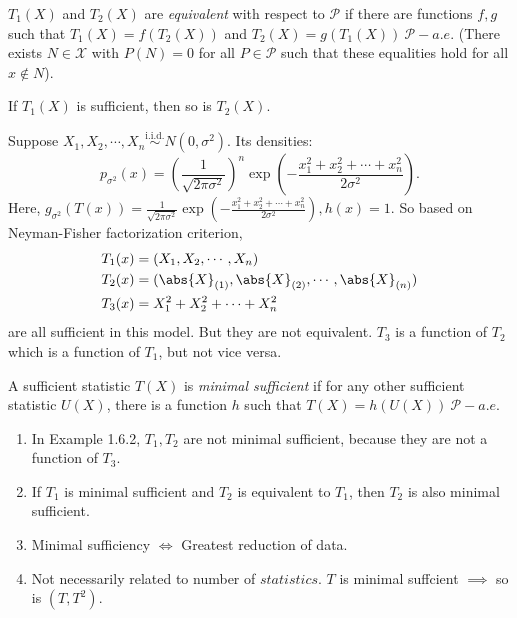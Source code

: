 \documentclass[a4paper]{article}
\begin{document}
\begin{defi}[Equivalent]
	$T_1(X)$ and $T_2(X)$ are \emph{equivalent} with respect to $\mathcal{P}$ if there are functions $f,g$ such that $T_1(X)=f(T_2(X))$ and $T_2(X)=g(T_1(X)) \ \mathcal{P}-a.e.$ (There exists $N \in \mathcal{X}$ with $P(N)=0 $ for all $P \in \mathcal{P}$ such that these equalities hold for all $x \notin N$).
\end{defi}

\begin{note}
	If $T_1(X)$ is sufficient, then so is $T_2(X)$.	
\end{note}

\begin{eg}
	Suppose $X_1, X_2, \cdots, X_n \stackrel{\text{i.i.d.}}{\sim} N(0,\sigma ^2)$. Its densities:
	\begin{equation*}
		p_{\sigma^2}(x)=\left(\frac{1}{\sqrt{2 \pi \sigma^2}}\right)^n\exp\left(-\frac{x_1^2+x_2^2+\cdots+x_n^2}{2\sigma^2}\right).
	\end{equation*}
	Here, $g_{\sigma^2}(T(x))=\frac{1}{\sqrt{2 \pi \sigma^2}}\exp\left(-\frac{x_1^2+x_2^2+\cdots+x_n^2}{2\sigma^2}\right), h(x)=1$. So based on Neyman-Fisher factorization criterion, 
	\begin{equation}
		\begin{aligned}
			T_1(x) &= (X_1,X_2,\cdots,X_n) \\
			T_2(x) &= (\abs{X}_{(1)},\abs{X}_{(2)},\cdots,\abs{X}_{(n)}) \\
			T_3(x) &= X_1^2+X_2^2+\cdots+X_n^2
		\end{aligned}
	\end{equation}
	are all sufficient in this model. But they are not equivalent. $T_3$ is a function of $T_2$ which is a function of $T_1$, but not vice versa.
\end{eg}

\begin{defi}
	A sufficient statistic $T(X)$ is \emph{minimal sufficient} if for any other sufficient statistic $U(X)$, there is a function $h$ such that $T(X)=h(U(X)) \ \mathcal{P}-a.e.$
\end{defi}

\begin{note}
	\quad 
	\begin{enumerate}
		\item In Example 1.6.2, $T_1,T_2$ are not minimal sufficient, because they are not a function of $T_3$.
		\item If $T_1$ is minimal sufficient and $T_2$ is equivalent to $T_1$, then $T_2$ is also minimal sufficient.
		\item Minimal sufficiency $\iff$ Greatest reduction of data.
		\item Not necessarily related to number of $statistics$. $T$ is minimal suffcient $\implies$ so is $(T,T^2)$.
	\end{enumerate}
\end{note}
\end{document}
